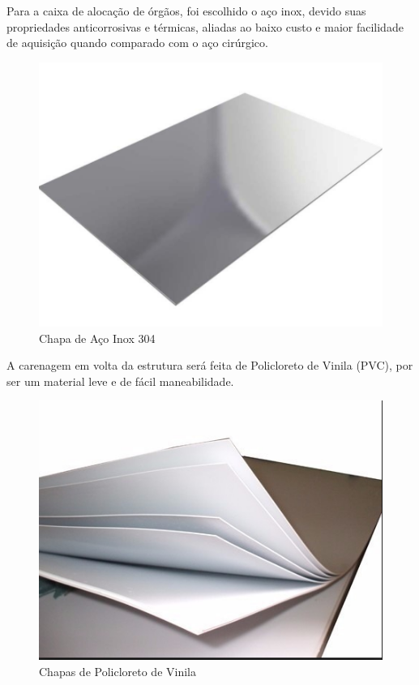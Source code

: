 Para a caixa de alocação de órgãos, foi escolhido o aço inox, devido suas propriedades anticorrosivas e térmicas, aliadas ao baixo custo e maior facilidade de aquisição quando comparado com o aço cirúrgico.

\begin{figure}[H]
\centering
\includegraphics[scale=0.8]{figuras/chapainox.png}
\caption{Chapa de Aço Inox 304}
\end{figure}

A carenagem em volta da estrutura será feita de Policloreto de Vinila (PVC), por ser um material leve e de fácil maneabilidade.

\begin{figure}[H]
\centering
\includegraphics[scale=0.8]{figuras/pvc.png}
\caption{Chapas de Policloreto de Vinila}
\end{figure}

